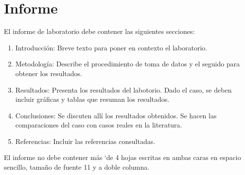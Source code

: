 \documentclass[10pt, a4paper]{exam}
\begin{document}
\section{Informe}
El informe de laboratorio debe contener las siguientes secciones: 
\begin{enumerate}
    \item Introducci\'on: Breve texto para poner en contexto el laboratorio.
    \item Metodolog\'ia: Describe el procedimiento de toma de datos y el seguido para obtener los resultados.
    \item Resultados: Presenta los resultados del labotorio. Dado el caso, se deben incluir gr\'aficas y tablas que resuman los resultados.
    \item Conclusiones: Se discuten all\'i los resultados obtenidos. Se hacen las comparaciones del caso con casos reales en la literatura.
    \item Referencias: Incluir las referencias consultadas.
\end{enumerate}
El informe no debe contener m\'as `de 4 hojas escritas en ambas caras en espacio sencillo, tama\~no de fuente 11 y a doble columna. 
\end{document}
